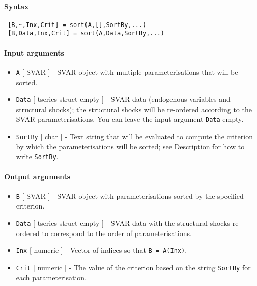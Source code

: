 


	\paragraph{Syntax}
 
 \begin{verbatim}
 [B,~,Inx,Crit] = sort(A,[],SortBy,...)
 [B,Data,Inx,Crit] = sort(A,Data,SortBy,...)
 \end{verbatim}
 
 \paragraph{Input arguments}
 
 \begin{itemize}
 \item
   \texttt{A} {[} SVAR {]} - SVAR object with multiple parameterisations
   that will be sorted.
 \item
   \texttt{Data} {[} tseries \textbar{} struct \textbar{} empty {]} -
   SVAR data (endogenous variables and structural shocks); the structural
   shocks will be re-ordered according to the SVAR parameterisations. You
   can leave the input argument \texttt{Data} empty.
 \item
   \texttt{SortBy} {[} char {]} - Text string that will be evaluated to
   compute the criterion by which the parameterisations will be sorted;
   see Description for how to write \texttt{SortBy}.
 \end{itemize}
 
 \paragraph{Output arguments}
 
 \begin{itemize}
 \item
   \texttt{B} {[} SVAR {]} - SVAR object with parameterisations sorted by
   the specified criterion.
 \item
   \texttt{Data} {[} tseries \textbar{} struct \textbar{} empty {]} -
   SVAR data with the structural shocks re-ordered to correspond to the
   order of parameterisations.
 \item
   \texttt{Inx} {[} numeric {]} - Vector of indices so that
   \texttt{B = A(Inx)}.
 \item
   \texttt{Crit} {[} numeric {]} - The value of the criterion based on
   the string \texttt{SortBy} for each parameterisation.
 \end{itemize}
 
